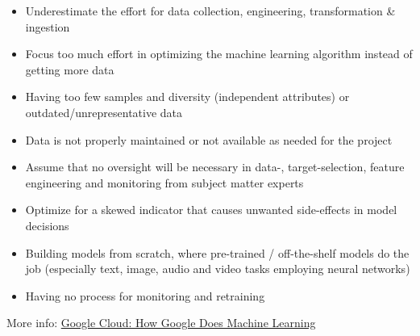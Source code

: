 \documentclass[
]{book}
\begin{document}
\begin{itemize}
\item
  Underestimate the effort for data collection, engineering,
  transformation \& ingestion
\item
  Focus too much effort in optimizing the machine learning algorithm
  instead of getting more data
\item
  Having too few samples and diversity (independent attributes) or
  outdated/unrepresentative data
\item
  Data is not properly maintained or not available as needed for the
  project
\item
  Assume that no oversight will be necessary in data-,
  target-selection, feature engineering and monitoring from subject
  matter experts
\item
  Optimize for a skewed indicator that causes unwanted side-effects in
  model decisions
\item
  Building models from scratch, where pre-trained / off-the-shelf
  models do the job (especially text, image, audio and video tasks
  employing neural networks)
\item
  Having no process for monitoring and retraining
\end{itemize}

More info: \href{https://www.cloudskillsboost.google/course_templates/10}{Google Cloud: How Google Does Machine
Learning}
\end{document}
